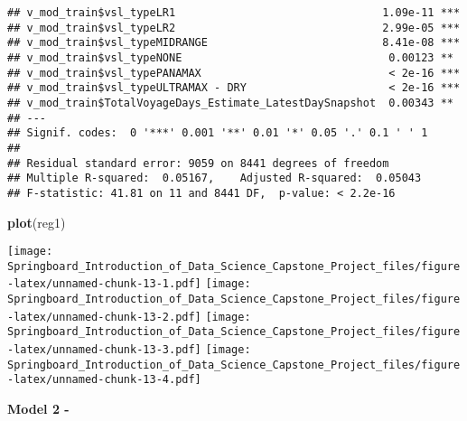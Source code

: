 \documentclass[]{article}
\newenvironment{Shaded}{\begin{snugshade}}{\end{snugshade}}
\newcommand{\KeywordTok}[1]{\textcolor[rgb]{0.13,0.29,0.53}{\textbf{#1}}}
\newcommand{\StringTok}[1]{\textcolor[rgb]{0.31,0.60,0.02}{#1}}
\newcommand{\CommentTok}[1]{\textcolor[rgb]{0.56,0.35,0.01}{\textit{#1}}}
\newcommand{\OperatorTok}[1]{\textcolor[rgb]{0.81,0.36,0.00}{\textbf{#1}}}
\newcommand{\NormalTok}[1]{#1}
\begin{document}
\begin{verbatim}
## v_mod_train$vsl_typeLR1                                1.09e-11 ***
## v_mod_train$vsl_typeLR2                                2.99e-05 ***
## v_mod_train$vsl_typeMIDRANGE                           8.41e-08 ***
## v_mod_train$vsl_typeNONE                                0.00123 ** 
## v_mod_train$vsl_typePANAMAX                             < 2e-16 ***
## v_mod_train$vsl_typeULTRAMAX - DRY                      < 2e-16 ***
## v_mod_train$TotalVoyageDays_Estimate_LatestDaySnapshot  0.00343 ** 
## ---
## Signif. codes:  0 '***' 0.001 '**' 0.01 '*' 0.05 '.' 0.1 ' ' 1
## 
## Residual standard error: 9059 on 8441 degrees of freedom
## Multiple R-squared:  0.05167,    Adjusted R-squared:  0.05043 
## F-statistic: 41.81 on 11 and 8441 DF,  p-value: < 2.2e-16
\end{verbatim}

\begin{Shaded}
\begin{Highlighting}[]
\KeywordTok{plot}\NormalTok{(reg1)}
\end{Highlighting}
\end{Shaded}

\texttt{[image: Springboard\_Introduction\_of\_Data\_Science\_Capstone\_Project\_files/figure-latex/unnamed-chunk-13-1.pdf]}
\texttt{[image: Springboard\_Introduction\_of\_Data\_Science\_Capstone\_Project\_files/figure-latex/unnamed-chunk-13-2.pdf]}
\texttt{[image: Springboard\_Introduction\_of\_Data\_Science\_Capstone\_Project\_files/figure-latex/unnamed-chunk-13-3.pdf]}
\texttt{[image: Springboard\_Introduction\_of\_Data\_Science\_Capstone\_Project\_files/figure-latex/unnamed-chunk-13-4.pdf]}

\textbf{Model 2 - }

\begin{Shaded}
\end{Shaded}
\end{document}
